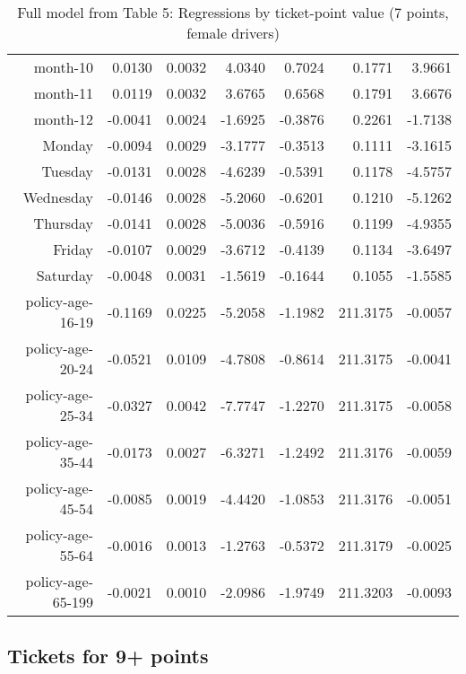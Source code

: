 \documentclass[10pt]{article}
\begin{document}
\begin{table}[ht]
\begin{tabular}{rrrrrrr}
  month-10 & 0.0130 & 0.0032 & 4.0340 & 0.7024 & 0.1771 & 3.9661 \\ 
  month-11 & 0.0119 & 0.0032 & 3.6765 & 0.6568 & 0.1791 & 3.6676 \\ 
  month-12 & -0.0041 & 0.0024 & -1.6925 & -0.3876 & 0.2261 & -1.7138 \\ 
  Monday & -0.0094 & 0.0029 & -3.1777 & -0.3513 & 0.1111 & -3.1615 \\ 
  Tuesday & -0.0131 & 0.0028 & -4.6239 & -0.5391 & 0.1178 & -4.5757 \\ 
  Wednesday & -0.0146 & 0.0028 & -5.2060 & -0.6201 & 0.1210 & -5.1262 \\ 
  Thursday & -0.0141 & 0.0028 & -5.0036 & -0.5916 & 0.1199 & -4.9355 \\ 
  Friday & -0.0107 & 0.0029 & -3.6712 & -0.4139 & 0.1134 & -3.6497 \\ 
  Saturday & -0.0048 & 0.0031 & -1.5619 & -0.1644 & 0.1055 & -1.5585 \\ 
  policy-age-16-19 & -0.1169 & 0.0225 & -5.2058 & -1.1982 & 211.3175 & -0.0057 \\ 
  policy-age-20-24 & -0.0521 & 0.0109 & -4.7808 & -0.8614 & 211.3175 & -0.0041 \\ 
  policy-age-25-34 & -0.0327 & 0.0042 & -7.7747 & -1.2270 & 211.3175 & -0.0058 \\ 
  policy-age-35-44 & -0.0173 & 0.0027 & -6.3271 & -1.2492 & 211.3176 & -0.0059 \\ 
  policy-age-45-54 & -0.0085 & 0.0019 & -4.4420 & -1.0853 & 211.3176 & -0.0051 \\ 
  policy-age-55-64 & -0.0016 & 0.0013 & -1.2763 & -0.5372 & 211.3179 & -0.0025 \\ 
  policy-age-65-199 & -0.0021 & 0.0010 & -2.0986 & -1.9749 & 211.3203 & -0.0093 \\ 
   \hline
\end{tabular}
\caption{Full model from Table 5: Regressions by ticket-point value (7 points, female drivers)} 
\label{tab_5_7_pts_F}
\end{table}


\clearpage
\pagebreak




\subsection*{Tickets for 9+ points}
\end{document}
